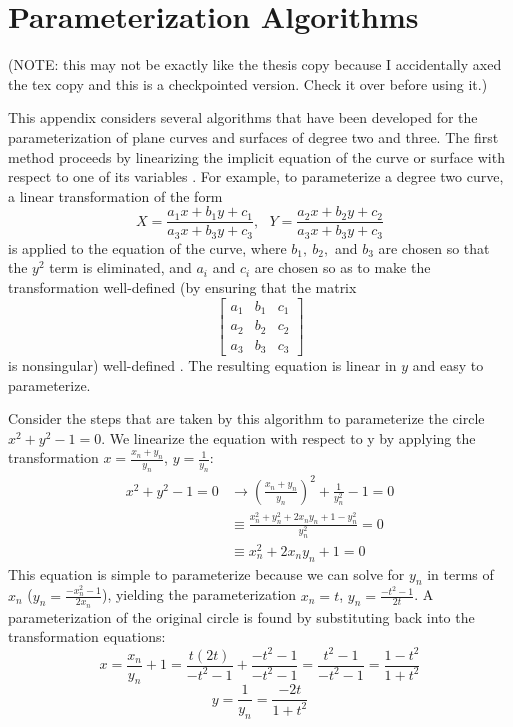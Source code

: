 \chapter{Parameterization Algorithms}
\label{app-D}
%
(NOTE: this may not be exactly like the thesis copy because
I accidentally axed the tex copy and this is a checkpointed version.
Check it over before using it.)

This appendix considers several algorithms that 
have been developed for the parameterization of 
plane curves and surfaces of degree two and three.
The first method proceeds by linearizing the implicit equation
of the curve or surface 
with respect to one of its variables \cite{abba1,abba2}.
For example, 
to parameterize a degree two curve, a linear transformation of the form
\[ X = \frac{a_{1}x + b_{1}y + c_{1}}{a_{3}x + b_{3}y + c_{3}},\ \ \ 
   Y = \frac{a_{2}x + b_{2}y + c_{2}}{a_{3}x + b_{3}y + c_{3}} \]
is applied to the equation of the curve, where $b_{1},\ b_{2},$ and $b_{3}$
are chosen so that the $y^{2}$ term is eliminated, and $a_{i}$ and $c_{i}$
are chosen so as to make the transformation well-defined (by ensuring
that the matrix
\[ \left[ \begin{array}{ccc}
a_{1} & b_{1} & c_{1} \\
a_{2} & b_{2} & c_{2} \\
a_{3} & b_{3} & c_{3}
\end{array}   \right] \]
is nonsingular) well-defined \cite{abba1}.
The resulting equation is linear in $y$ and easy to parameterize.
%
\begin{example}
\label{eg-appC}
Consider the steps that are taken by this algorithm to parameterize 
the circle \mbox{\( x^{2} + y^{2} - 1 = 0 \).}
We linearize the equation with respect to y by applying the transformation
\mbox{\( x = \frac{x_{n} + y_{n}}{y_{n}} \)},
\mbox{\( y = \frac{1}{y_{n}} \)}:
\[ \begin{array}{ll}
x^{2} + y^{2} - 1 = 0 & \rightarrow (\frac{x_{n}+y_{n}}{y_{n}})^{2} + 
  \frac{1}{y_{n}^{2}} - 1 = 0 \\
& \equiv \frac{x_{n}^{2} + y_{n}^{2} + 2x_{n}y_{n} + 1 - y_{n}^{2}}{y_{n}^2}
 = 0 \\
& \equiv x_{n}^{2} + 2x_{n}y_{n} + 1 = 0
\end{array} \]
This equation is simple to parameterize because we can solve for $y_{n}$
in terms of $x_{n}$ (\(y_{n} = \frac{-x_{n}^{2}-1}{2x_{n}} \)),
yielding the parameterization 
\( x_{n} = t \),
\( y_{n} = \frac{-t^{2}-1}{2t} \).
A parameterization of the original circle is found by substituting back
into the transformation equations:
\[ x = \frac{x_{n}}{y_{n}} + 1 = \frac{t(2t)}{-t^{2}-1} + 
  \frac{-t^{2}-1}{-t^{2}-1} = \frac{t^{2}-1}{-t^{2}-1} = 
  \frac{1-t^{2}}{1+t^{2}} \]
\[ y = \frac{1}{y_{n}} = \frac{-2t}{1+t^{2}} \]
\end{example}

